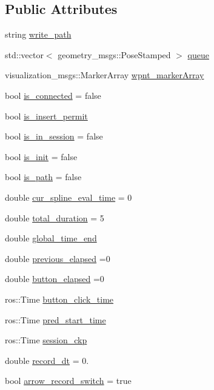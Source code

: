 \subsection*{Public Attributes}
\begin{DoxyCompactItemize}
\item 
string \hyperlink{class_q_node_a0967d1922eeb7e39eedca309c7003d23}{write\+\_\+path}
\item 
std\+::vector$<$ geometry\+\_\+msgs\+::\+Pose\+Stamped $>$ \hyperlink{class_q_node_ae7dd0fd8218c767bfa1ff5ba837cd165}{queue}
\item 
visualization\+\_\+msgs\+::\+Marker\+Array \hyperlink{class_q_node_a7fa96879efd44c15a8b03f3cdd9d665b}{wpnt\+\_\+marker\+Array}
\item 
bool \hyperlink{class_q_node_a98b08e7704b00df8648f8c08dffe950c}{is\+\_\+connected} = false
\item 
bool \hyperlink{class_q_node_a2bbe086eaeebbc5000e7cd2fd6257043}{is\+\_\+insert\+\_\+permit}
\item 
bool \hyperlink{class_q_node_a6ace2d0aa89adecfe699b3f1c3ce0b0f}{is\+\_\+in\+\_\+session} = false
\item 
bool \hyperlink{class_q_node_a53a7eeda1a2054b66441bd029976dd33}{is\+\_\+init} = false
\item 
bool \hyperlink{class_q_node_ae7023e2ee0bf48734c2c2181be96abc7}{is\+\_\+path} = false
\item 
double \hyperlink{class_q_node_a45fa5f948c36d96f286d65cee0fef22b}{cur\+\_\+spline\+\_\+eval\+\_\+time} = 0
\item 
double \hyperlink{class_q_node_a230cb427536b2173add5e35063bcc446}{total\+\_\+duration} = 5
\item 
double \hyperlink{class_q_node_a7184edc0e91cf617eb5c3a114858f3ce}{global\+\_\+time\+\_\+end}
\item 
double \hyperlink{class_q_node_a4b5f0a40821fbb176de620cb5a3921f7}{previous\+\_\+elapsed} =0
\item 
double \hyperlink{class_q_node_a2893bbeba854c1cc89d2271804325b7b}{button\+\_\+elapsed} =0
\item 
ros\+::\+Time \hyperlink{class_q_node_a96e6599c14732ded065ae6a5b004f872}{button\+\_\+click\+\_\+time}
\item 
ros\+::\+Time \hyperlink{class_q_node_aaac0b11e5a9902a566a9f952da85d5a5}{pred\+\_\+start\+\_\+time}
\item 
ros\+::\+Time \hyperlink{class_q_node_a147dc78b7181841f9b80711b14d371d4}{session\+\_\+ckp}
\item 
double \hyperlink{class_q_node_ad1f3252201b932fc5d39b4f80349c7e2}{record\+\_\+dt} = 0.
\item 
bool \hyperlink{class_q_node_ada91a6275708099206c452df47210045}{arrow\+\_\+record\+\_\+switch} = true
\end{DoxyCompactItemize}
